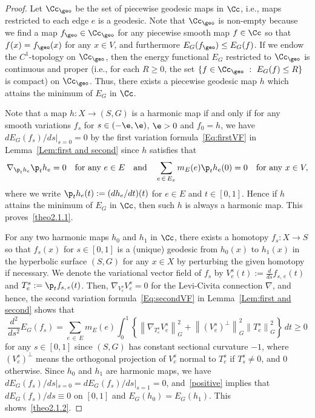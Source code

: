\begin{proof}
Let $\Cc_\geo$ be the set of piecewise geodesic maps in $\Cc$, i.e., maps restricted to each edge $e$ is a geodesic. Note that $\Cc_\geo$ is non-empty because we find a map $f_\geo \in \Cc_\geo$ for any piecewise smooth map $f\in \Cc$ so that $f(x)=f_\geo(x)$ for any $x\in V$, and furthermore $E_G(f_\geo)\leq E_G(f)$. If we endow the $C^1$-topology on $\Cc_\geo$, then the energy functional $E_G$ restricted to $\Cc_\geo$ is continuous and proper (i.e., for each $R \ge 0$, the set $\{f \in \Cc_\geo \ : \ E_G(f) \le R\}$ is compact) on $\Cc_\geo$. Thus, there exists a piecewise geodesic map $h$ which attains the minimum of $E_G$ in $\Cc$.


Note that a map $h:X \to (S, G)$ is a harmonic map if and only if for any smooth variations $f_s$ for $s\in (-\e, \e)$, $\e>0$ and $f_0=h$, we have $dE_G(f_s)/ds|_{s=0}=0$ by the first variation formula~\eqref{Eq:firstVF} in Lemma~\ref{Lem:first and second} since $h$ satisfies that
\[
\nabla_{\p_t h_{e}}\p_t h_{e}=0 \quad \text{for any }e \in E \quad \text{and} \quad \sum_{e\,\in\,E_x}m_E(e)\p_t h_{e}(0)=0 \quad \text{for any }x \in V,
\]
where we write $\p_t h_{e}(t):=(d h_e/dt)(t)$ for $e \in E$ and $t \in [0, 1]$. Hence if $h$ attains the minimum of $E_G$ in $\Cc$, then such $h$ is always a harmonic map. This proves~\eqref{theo2.1.1}.


For any two harmonic maps $h_0$ and $h_1$ in $\Cc$, there exists a homotopy $f_s: X \to S$ so that $f_s(x)$ for $s \in [0, 1]$ is a (unique) geodesic from $h_0(x)$ to $h_1(x)$ in the hyperbolic surface $(S, G)$ for any $x\in X$ by perturbing the given homotopy if necessary. We denote the variational vector field of $f_s$ by $V_e^s(t):=\tfrac{d}{ds} f_{s,\,e}(t)$ and $T_e^s:=\p_t f_{s,\,e}(t)$. Then, $\nabla_{V_e^s}V_e^s=0$ for the Levi-Civita connection $\nabla$, and hence, the second variation formula~\eqref{Eq:secondVF} in Lemma~\ref{Lem:first and second} shows that
\begin{equation}\label{positive}
\frac{d^2}{ds^2}E_G(f_s)=\sum_{e\,\in\,E} m_E(e)\int_0^1\left\{\left\|\nabla_{T_e^s} V_e^s\right\|_G^2+\left\|\left(V_e^s\right)^\perp\right\|_G^2\left\|T_e^s\right\|_G^2\right\}\,dt\geq 0
\end{equation}
for any $s\in [0,1]$ since $(S,G)$ has constant sectional curvature $-1$, where $(V_e^s)^\perp$ means the orthogonal projection of $V_e^s$ normal to $T_e^s$ if $T_s^s \neq 0$, and $0$ otherwise. Since $h_0$ and $h_1$ are harmonic maps, we have $dE_G(f_s)/ds|_{s=0}=dE_G(f_s)/ds|_{s=1}=0$, and~\eqref{positive} implies that $dE_G(f_s)/ds\equiv 0$ on $[0,1]$ and $E_G(h_0)=E_G(h_1)$. This shows~\eqref{theo2.1.2}.


\end{proof}
